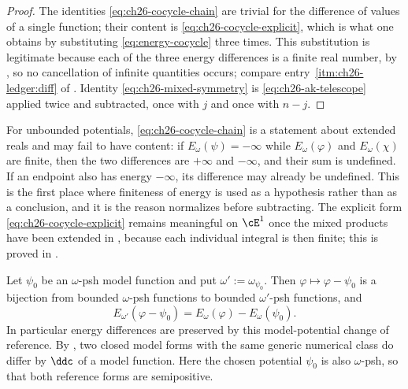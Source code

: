 \begin{proof}
The identities \eqref{eq:ch26-cocycle-chain} are trivial for the difference
of values of a single function; their content is
\eqref{eq:ch26-cocycle-explicit}, which is what one obtains by substituting
\eqref{eq:energy-cocycle} three times.  This substitution is legitimate
because each of the three energy differences is a finite real number, by
, so no cancellation of infinite quantities
occurs; compare entry~\cref{itm:ch26-ledger:diff} of
.  Identity \eqref{eq:ch26-mixed-symmetry} is
\eqref{eq:ch26-ak-telescope} applied twice and subtracted, once with $j$ and
once with $n-j$.
\end{proof}

\begin{remark}
\label{rem:ch26-cocycle-caution}
For unbounded potentials, \eqref{eq:ch26-cocycle-chain} is a statement about
extended reals and may fail to have content: if
$E_\omega(\psi)=-\infty$ while $E_\omega(\varphi)$ and
$E_\omega(\chi)$ are finite, then the two differences are $+\infty$ and
$-\infty$, and their sum is undefined.  If an endpoint also has energy
$-\infty$, its difference may already be undefined.  This is the first place where finiteness of energy
is used as a hypothesis rather than as a conclusion, and it is the reason
 normalizes before subtracting.  The
explicit form \eqref{eq:ch26-cocycle-explicit} remains meaningful on
$\cE^1$ once the mixed products have been extended in
, because each individual integral is then
finite; this is proved in .
\end{remark}

\begin{proposition}
\label{prop:ch26-reference-change}
Let $\psi_0$ be an $\omega$-psh model function and put
$\omega':=\omega_{\psi_0}$.  Then $\varphi\mapsto\varphi-\psi_0$ is a
bijection from bounded $\omega$-psh functions to bounded
$\omega'$-psh functions, and
\begin{equation}
\label{eq:ch26-reference-change}
 E_{\omega'}(\varphi-\psi_0)
 =E_\omega(\varphi)-E_\omega(\psi_0).
\end{equation}
In particular energy differences are preserved by this model-potential
change of reference.  By , two closed model
forms with the same generic numerical class do differ by $\ddc$ of a
model function.  Here the chosen potential $\psi_0$ is also $\omega$-psh,
so that both reference forms are semipositive.
\end{proposition}

